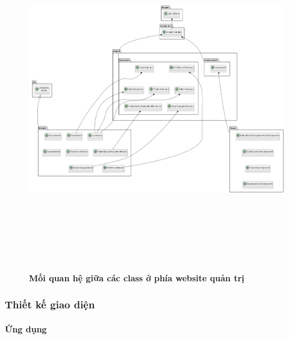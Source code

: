 \begin{enumerate}[a)]
\begin{figure}[H]
  \centering
  \includegraphics[width=16cm,height=15cm]{Images/server/class/class_admin_relation.png}
  \caption[Mối quan hệ giữa các class ở phía website quản trị]{\bfseries \fontsize{12pt}{0pt}\selectfont Mối quan hệ giữa các class ở phía website quản trị}
  \label{class_admin_relation} %
\end{figure}

\end{enumerate}



\subsubsection{Thiết kế giao diện}

\paragraph{Ứng dụng}
\mbox{}


